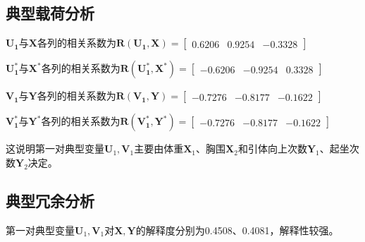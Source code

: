 \documentclass[withoutpreface]{cumcmthesis}
\begin{document}
\subsection{典型载荷分析}
$\mathbf{U_1}$与$\mathbf{X}$各列的相关系数为$\mathbf{R(U_1,X)}=\begin{bmatrix}0.6206&0.9254&-0.3328\end{bmatrix}$

$\mathbf{U^*_1}$与$\mathbf{X^*}$各列的相关系数为$\mathbf{R(U^*_1,X^*)}
    =\begin{bmatrix}
        -0.6206 & -0.9254 & 0.3328
    \end{bmatrix}$

$\mathbf{V_1}$与$\mathbf{Y}$各列的相关系数为$\mathbf{R(V_1,Y)}=\begin{bmatrix}-0.7276&-0.8177&-0.1622\end{bmatrix}$

$\mathbf{V^*_1}$与$\mathbf{Y^*}$各列的相关系数为$\mathbf{R(V^*_1,Y^*)}=\begin{bmatrix}-0.7276&-0.8177&-0.1622\end{bmatrix}$

这说明第一对典型变量$\mathbf{U}_1,\mathbf{V}_1$主要由体重$\mathbf{X}_1$、胸围$\mathbf{X}_2$和引体向上次数$\mathbf{Y}_1$、起坐次数$\mathbf{Y}_2$决定。

\subsection{典型冗余分析}
第一对典型变量$\mathbf{U}_1,\mathbf{V}_1$对$\mathbf{X},\mathbf{Y}$的解释度分别为0.4508、0.4081，解释性较强。

\appendix
\end{document}
